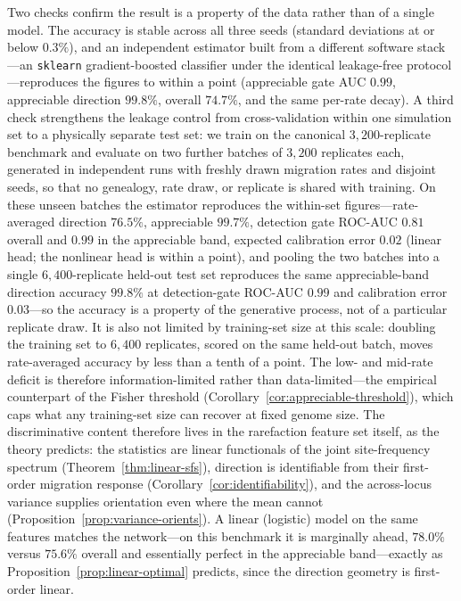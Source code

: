 \documentclass[11pt]{article}
\theoremstyle{plain}
\theoremstyle{definition}
\theoremstyle{remark}
\begin{document}
Two checks confirm the result is a property of the data rather than of a single model. The accuracy
is stable across all three seeds (standard deviations at or below $0.3\%$), and an independent
estimator built from a different software stack---an \texttt{sklearn} gradient-boosted classifier
under the identical leakage-free protocol---reproduces the figures to within a point (appreciable
gate AUC $0.99$, appreciable direction $99.8\%$, overall $74.7\%$, and the same per-rate decay).
A third check strengthens the leakage control from cross-validation within one simulation set to a
physically separate test set: we train on the canonical $3{,}200$-replicate benchmark and evaluate
on two further batches of $3{,}200$ replicates each, generated in independent runs with freshly
drawn migration rates and disjoint seeds, so that no genealogy, rate draw, or replicate is shared
with training. On these unseen batches the estimator reproduces the within-set figures---rate-averaged
direction $76.5\%$, appreciable $99.7\%$, detection gate ROC-AUC $0.81$ overall and $0.99$ in the
appreciable band, expected calibration error $0.02$ (linear head; the nonlinear head is within a
point), and pooling the two batches into a single $6{,}400$-replicate held-out test set reproduces
the same appreciable-band direction accuracy $99.8\%$ at detection-gate ROC-AUC $0.99$ and
calibration error $0.03$---so the accuracy is a property of the generative process, not of a
particular replicate draw.
It is also not limited by training-set size at this scale: doubling the training set to $6{,}400$
replicates, scored on the same held-out batch, moves rate-averaged accuracy by less than a tenth of a
point. The low- and mid-rate deficit is therefore information-limited rather than data-limited---the
empirical counterpart of the Fisher threshold (Corollary~\ref{cor:appreciable-threshold}), which caps
what any training-set size can recover at fixed genome size.
The discriminative content therefore lives in the rarefaction feature set itself, as the theory
predicts: the statistics are linear functionals of the joint site-frequency spectrum
(Theorem~\ref{thm:linear-sfs}), direction is identifiable from their first-order migration response
(Corollary~\ref{cor:identifiability}), and the across-locus variance supplies orientation even where
the mean cannot (Proposition~\ref{prop:variance-orients}). A linear (logistic) model on the same
features matches the network---on this benchmark it is marginally ahead, $78.0\%$ versus $75.6\%$
overall and essentially perfect in the appreciable band---exactly as
Proposition~\ref{prop:linear-optimal} predicts, since the direction geometry is first-order linear.
\end{document}
